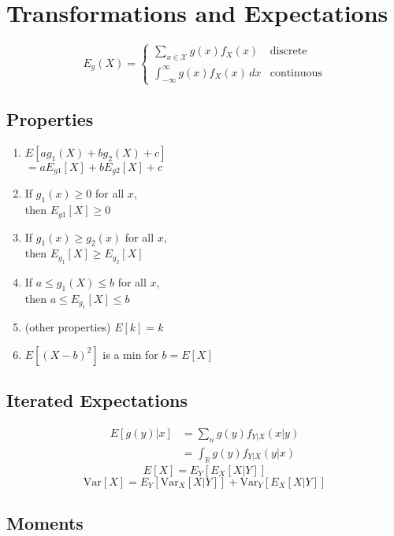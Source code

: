 \section{Transformations and Expectations}
\begin{equation*}
	E_g(X) = 
	\begin{cases}
		\sum_{x\in\mathcal X} g(x)f_X(x) & \text{discrete} \\
		\int_{-\infty}^{\infty} g(x)f_X(x) \,dx & \text{continuous}
	\end{cases}
\end{equation*}
\subsection*{Properties}
	\begin{enumerate}
		\item \(E[ag_1(X) +bg_2(X) + c] \)\\ \(= aE_{g1}[X] + bE_{g2}[X] + c \)
		\item If \(g_1(x)\geq0\) for all \(x\), \\ then \(E_{g1}[X]\geq0\)
		\item If \(g_1(x) \geq g_2(x)\) for all \(x\), \\ then \(E_{g_1}[X] \geq E_{g_2}[X]\)
		\item If \(a \leq g_1(X) \leq b\) for all \(x\), \\ then \(a \leq E_{g_1}[X] \leq b\)
		\item (other properties) \(E[k] = k\)
		\item \(E[(X-b)^2]\) is a min for \(b=E[X]\)
	\end{enumerate}

\subsection*{Iterated Expectations}
	\begin{equation*}
		\begin{split}
			E[g(y)|x]  
			&= \sum_{n} g(y)f_{Y|X}(x|y) \\
			&= \int_{\mathbb{R}} g(y)f_{Y|X}(y|x) 
		\end{split}
	\end{equation*}
	\[E[X] = E_Y[E_X[X|Y]]\]
	\[\text{Var}[X] = E_Y[\text{Var}_X[X|Y]] + \text{Var}_Y[E_X[X|Y]]\]
	
\subsection*{Moments}
